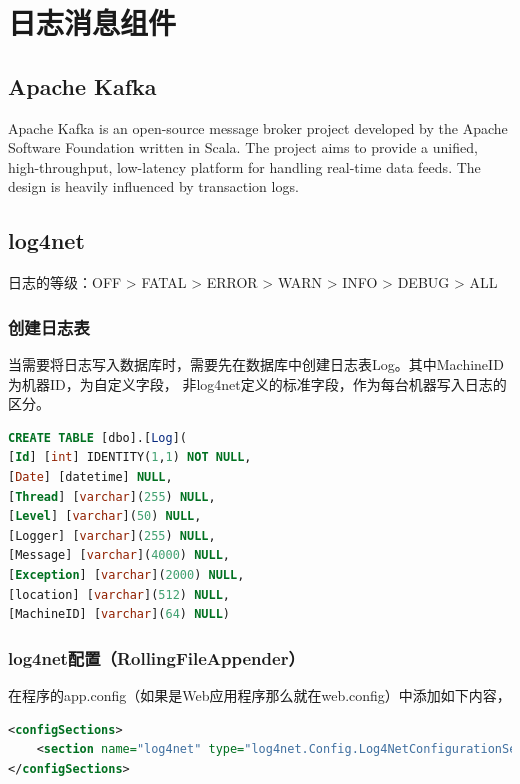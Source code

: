\documentclass{book}
\begin{document}
\clearpage
\mbox{}
\clearpage

\chapter{日志消息组件}

\clearpage

\section{Apache Kafka}

Apache Kafka is an open-source message broker project 
developed by the Apache Software Foundation written in Scala. 
The project aims to provide a unified, high-throughput, 
low-latency platform for handling real-time data feeds. 
The design is heavily influenced by transaction logs.

\section{log4net}

日志的等级：OFF > FATAL > ERROR > WARN > INFO > DEBUG  > ALL

\subsection{创建日志表}

当需要将日志写入数据库时，需要先在数据库中创建日志表Log。其中MachineID为机器ID，为自定义字段，
非log4net定义的标准字段，作为每台机器写入日志的区分。

\begin{lstlisting}[language=SQL]
CREATE TABLE [dbo].[Log](	
[Id] [int] IDENTITY(1,1) NOT NULL,
[Date] [datetime] NULL,
[Thread] [varchar](255) NULL,	
[Level] [varchar](50) NULL,	
[Logger] [varchar](255) NULL,
[Message] [varchar](4000) NULL,	
[Exception] [varchar](2000) NULL,	
[location] [varchar](512) NULL,
[MachineID] [varchar](64) NULL)
\end{lstlisting}

\subsection{log4net配置（RollingFileAppender）}

在程序的app.config（如果是Web应用程序那么就在web.config）中添加如下内容，

\begin{lstlisting}[language=XML]
<configSections>    
	<section name="log4net" type="log4net.Config.Log4NetConfigurationSectionHandler, log4net"/>
</configSections>
\end{lstlisting}
\end{document}
